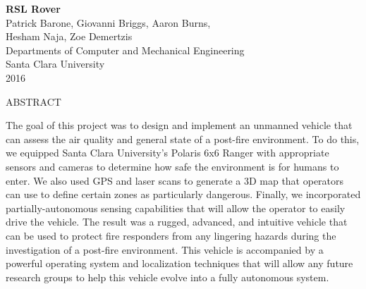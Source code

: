 
\setcounter{page}{3}

\begingroup
\renewcommand{\baselinestretch}{1} 
\begin{center}
	\Large\textbf{RSL Rover} \\
	\vspace{0.25in}
	\normalsize{Patrick Barone, Giovanni Briggs, Aaron Burns, \\ Hesham Naja, Zoe Demertzis} \\
	\vspace{0.25in}
	\normalsize{Departments of Computer and Mechanical Engineering \\ Santa Clara University \\ 2016} \\
	\vspace{0.5in}

	\large{ABSTRACT}
\end{center}

\begin{changemargin}{0.5in}{0.5in}
     The goal of this project was to design and implement an unmanned vehicle that can assess the air quality and general state of a post-fire environment. To do this, we equipped Santa Clara University's Polaris 6x6 Ranger with appropriate sensors and cameras to determine how safe the environment is for humans to enter. We  also used GPS and laser scans to generate a 3D map that operators can use to define certain zones as particularly dangerous. Finally, we incorporated partially-autonomous sensing capabilities that will allow the operator to easily drive the vehicle. The result was a rugged, advanced, and intuitive vehicle that can be used to protect fire responders from any lingering hazards during the investigation of a post-fire environment. This vehicle  is accompanied by a powerful operating system and localization techniques that will allow any future research groups to help this vehicle evolve into a fully autonomous system. 
     
    \end{changemargin}
     
 


